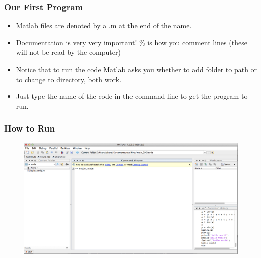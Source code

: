 \documentclass{beamer}
\begin{document}

\begin{frame}
\frametitle{ Our First Program} 
\begin{itemize}
\item Matlab files are denoted by a .m at the end of the name.
\item Documentation is very very important! \% is how you comment lines (these will not be read by the computer) 
\item Notice that to run the code Matlab asks you whether to add folder to path or to change to directory, both work. 
\item Just type the name of the code in the command line to get the program to run. 
\end{itemize}

\end{frame}



\begin{frame}
\frametitle{How to Run} 

\begin{figure}
\includegraphics[width=\textwidth, height= 0.8\textheight]{./pictures/hello_world}
\end{figure}
\end{frame}
\end{document}

